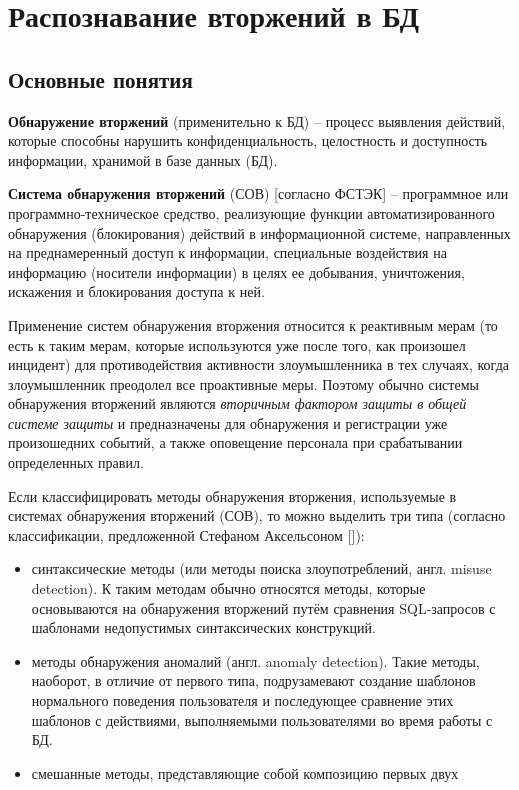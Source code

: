 
\section{Распознавание вторжений в БД}



\subsection{Основные понятия}

\textbf{Обнаружение вторжений} (применительно к БД) -- процесс выявления действий, 
которые способны нарушить конфиденциальность, целостность и доступность информации, 
хранимой в базе данных (БД).

\textbf{Система обнаружения вторжений} (СОВ) [согласно ФСТЭК] -- программное или программно-техническое 
средство, реализующие функции автоматизированного обнаружения (блокирования) действий в информационной системе, 
направленных на преднамеренный доступ к информации, специальные воздействия на информацию (носители информации) 
в целях ее добывания, уничтожения, искажения и блокирования доступа к ней.

Применение систем обнаружения вторжения относится к реактивным мерам (то есть к таким мерам, которые 
используются уже после того, как произошел инцидент) для противодействия активности злоумышленника в тех 
случаях, когда злоумышленник преодолел все проактивные меры. Поэтому обычно системы обнаружения вторжений 
являются \textit{вторичным фактором защиты в общей системе защиты} и предназначены для обнаружения и регистрации
уже произошедних событий, а также оповещение персонала при срабатывании определенных правил.

Если классифицировать методы обнаружения вторжения, используемые в системах обнаружения вторжений (СОВ), 
то можно выделить три типа (согласно классификации, предложенной Стефаном Аксельсоном [\cite{IDSClassification}]):
\begin{itemize}
	\item синтаксические методы (или методы поиска злоупотреблений, англ. misuse detection).
		К таким методам обычно относятся методы, которые основываются на обнаружения вторжений 
		путём сравнения SQL-запросов с шаблонами недопустимых синтаксических конструкций.
	\item методы обнаружения аномалий (англ. anomaly detection).
		Такие методы, наоборот, в отличие от первого типа, подрузамевают создание шаблонов нормального 
		поведения пользователя и последующее сравнение этих шаблонов с действиями, выполняемыми пользователями 
		во время работы с БД.
	\item смешанные методы, представляющие собой композицию первых двух
\end{itemize}




